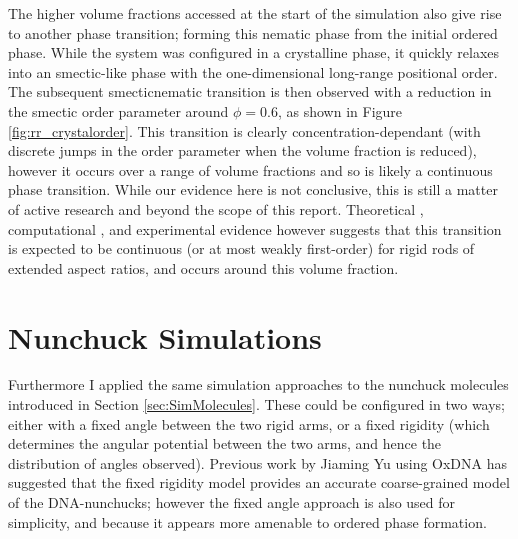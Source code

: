 \documentclass[11pt, a4paper]{article} %
\begin{document}
The higher volume fractions accessed at the start of the simulation also give rise to another phase transition; forming this nematic phase from the initial ordered phase. While the system was configured in a crystalline phase, it quickly relaxes into an smectic-like phase with the one-dimensional long-range positional order. The subsequent smectic\textendash nematic transition is then observed with a reduction in the smectic order parameter around $\phi  = 0.6$, as shown in Figure \ref{fig:rr_crystalorder}. This transition is clearly concentration-dependant (with discrete jumps in the order parameter when the volume fraction is reduced), however it occurs over a range of volume fractions and so is likely a continuous phase transition. While our evidence here is not conclusive, this is still a matter of active research and beyond the scope of this report. Theoretical \cite{Wen1987}, computational \cite{Frenkel1988, McGrother1996}, and experimental \cite{Dogic1997, Doane1972} evidence however suggests that this transition is expected to be continuous (or at most weakly first-order) for rigid rods of extended aspect ratios, and occurs around this volume fraction. 

\section{Nunchuck Simulations} \label{sec:Nunchuck_Sim}
Furthermore I applied the same simulation approaches to the nunchuck molecules introduced in Section \ref{sec:SimMolecules}. These could be configured in two ways; either with a fixed angle between the two rigid arms, or a fixed rigidity (which determines the angular potential between the two arms, and hence the distribution of angles observed). Previous work by Jiaming Yu using OxDNA \cite{OxDNA} has suggested that the fixed rigidity model provides an accurate coarse-grained model of the DNA-nunchucks; however the fixed angle approach is also used for simplicity, and because it appears more amenable to ordered phase formation.


\end{document}
